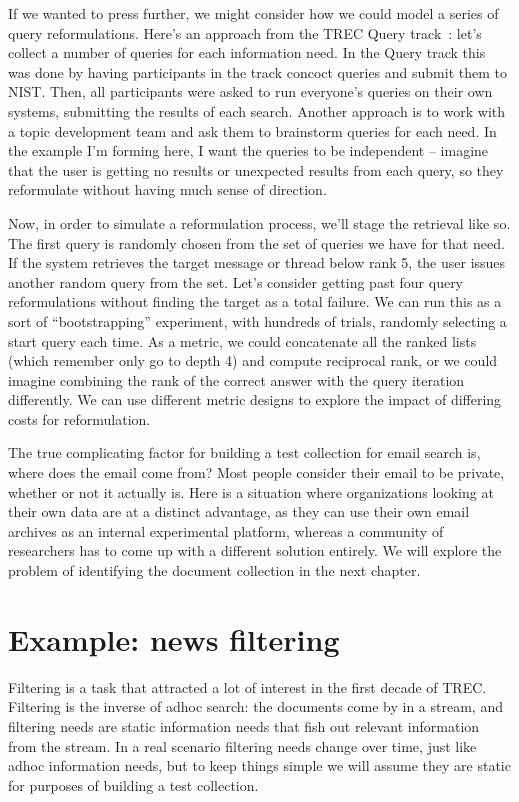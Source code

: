 \documentclass[nobib]{tufte-book}
\begin{document}
If we wanted to press further, we might consider how we could model a series of query reformulations.  Here's an approach from the TREC Query track~\autocite{buckley_query_track_2000}: let's collect a number of queries for each information need.  In the Query track this was done by having participants in the track concoct queries and submit them to NIST.  Then, all participants were asked to run everyone's queries on their own systems, submitting the results of each search. Another approach is to work with a topic development team and ask them to brainstorm queries for each need.  In the example I'm forming here, I want the queries to be independent -- imagine that the user is getting no results or unexpected results from each query, so they reformulate without having much sense of direction.

Now, in order to simulate a reformulation process, we'll stage the retrieval like so.  The first query is randomly chosen from the set of queries we have for that need.  If the system retrieves the target message or thread below rank 5, the user issues another random query from the set.  Let's consider getting past four query reformulations without finding the target as a total failure.  We can run this as a sort of ``bootstrapping'' experiment, with hundreds of trials, randomly selecting a start query each time.  As a metric, we could concatenate all the ranked lists (which remember only go to depth 4) and compute reciprocal rank, or we could imagine combining the rank of the correct answer with the query iteration differently.  We can use different metric designs to explore the impact of differing costs for reformulation.

The true complicating factor for building a test collection for email search is, where does the email come from?  Most people consider their email to be private, whether or not it actually is.  Here is a situation where organizations looking at their own data are at a distinct advantage, as they can use their own email archives as an internal experimental platform, whereas a community of researchers has to come up with a different solution entirely.  We will explore the problem of identifying the document collection in the next chapter.

\section{Example: news filtering}

Filtering is a task that attracted a lot of interest in the first decade of TREC.  Filtering is the inverse of adhoc search: the documents come by in a stream, and filtering needs are static information needs that fish out relevant information from the stream.  In a real scenario filtering needs change over time, just like adhoc information needs, but to keep things simple we will assume they are static for purposes of building a test collection.
\end{document}
